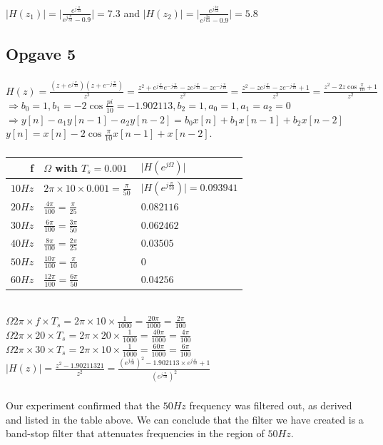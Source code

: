 \documentclass[a4paper, 12pt, titlepage]{article}
\begin{document}
\subsubsection{}
$\lvert H(z_1)\rvert = \lvert
\frac{e^{j\frac{\pi}{32}}}{e^{j\frac{\pi}{32}}-0.9}\rvert =7.3$ and 
$\lvert H(z_2)\rvert = \lvert
\frac{e^{j\frac{3\pi}{64}}}{e^{j\frac{3\pi}{64}}-0.9}\rvert =5.8$
\subsection{Opgave 5}
\subsubsection{}
$H(z) =
\frac{(z+e^{j\frac{\pi}{10}})(z+e^{-j\frac{\pi}{10}})}{z^2}=
\frac{z^2+e^{j\frac{\pi}{10}}e^{-j\frac{\pi}{10}}-ze^{j\frac{\pi}{10}}-ze^{-j\frac{\pi}{10}}}{z^2}=
\frac{z^2-ze^{j\frac{\pi}{10}}-ze^{-j\frac{\pi}{10}}+1}{z^2}=
\frac{z^2-2z\cos{\frac{\pi}{10}}+1}{z^2}$ \\
$\Rightarrow b_0=1 , b_1 = -2\cos{\frac{pi}{10}} = -1.902113 , b_2= 1 , a_0 = 1,
a_1 = a_2 = 0$ \\
$\Rightarrow y[n] - a_1 y[n-1] - a_2 y[n-2] = b_0 x[n] + b_1 x[n-1] + b_2
x[n-2]$\\
$y[n]= x[n]-2 \cos{\frac{\pi}{10}} x[n-1] + x[n-2]$.
\subsubsection{}

\begin{tabular}{r || l | l}
    f & $\Omega$ with $T_s = 0.001$ & $\lvert H (e^{j\Omega})\rvert$ \\ \hline \hline
    $10Hz$  & $2\pi \times 10 \times 0.001 = \frac{\pi}{50}$ & $\lvert
    H(e^{j\frac{\pi}{50}})\rvert = 0.093941$ \\ \hline
    $20Hz$  & $\frac{4\pi}{100} = \frac{\pi}{25}$ & $0.082116$ \\ \hline
    $30Hz$  & $\frac{6\pi}{100} = \frac{3\pi}{50}$ & $0.062462$ \\ \hline
    $40Hz$  & $\frac{8\pi}{100} = \frac{2\pi}{25}$ & $0.03505$ \\ \hline
    $50Hz$  & $\frac{10\pi}{100} = \frac{\pi}{10}$ & $0$ \\ \hline
    $60Hz$  & $\frac{12\pi}{100} = \frac{6\pi}{50}$ & $0.04256$ \\ \hline
\end{tabular}\\
$\Omega 2\pi \times f \times T_s = 2\pi \times 10 \times \frac{1}{1000} =
\frac{20\pi}{1000}=\frac{2\pi}{100}$\\
$\Omega 2\pi \times 20 \times T_s = 2\pi \times 20 \times \frac{1}{1000} =
\frac{40\pi}{1000}=\frac{4\pi}{100}$\\
$\Omega 2\pi \times 30 \times T_s = 2\pi \times 10 \times \frac{1}{1000} =
\frac{60\pi}{1000}=\frac{6\pi}{100}$\\
$\lvert H(z) \rvert = \frac{z^2 - 1.90211321}{z^2} =
\frac
{
(e^{j\frac{\pi}{50}})^2 
-1.902113 \times e^{j\frac{\pi}{50}}+1
}
{
(e^{j\frac{\pi}{50}})^2
}$
\subsubsection{}
Our experiment confirmed that the $50Hz$ frequency was filtered out, as derived
and listed in the table above. We can conclude that the filter we have created
is a band-stop filter that attenuates frequencies in the region of $50Hz$.
\end{document}
